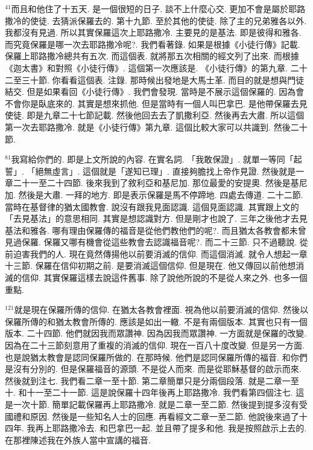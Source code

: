 \documentclass{book}
\begin{document}
$^{41}$而且和他住了十五天.
是一個很短的日子.
談不上什麼心交.
更加不會是屬於耶路撒冷的使徒.
去猜派保羅去的.
第十九節.
至於其他的使徒.
除了主的兄弟雅各以外.
我都沒有見過.
所以其實保羅這次上耶路撒冷.
主要見的是基法.
即是彼得和雅各.
而究竟保羅是哪一次去耶路撒冷呢?.
我們看著錄.
如果是根據《小徒行傳》記載.
保羅上耶路撒冷總共有五次.
而這個表.
就將那五次相關的經文列了出來.
而根據《迦太書》和對照《小徒行傳》.
這個第一次應該是.
《小徒行傳》的第九章.
二十二至三十節.
你看看這個表.
注錄.
那時候出發地是大馬士革.
而目的就是想與門徒結交.
但是如果看回《小徒行傳》.
我們會發現.
當時是不展示這個保羅的.
因為會不會你是臥底來的.
其實是想來抓他.
但是當時有一個人叫巴拿巴.
是他帶保羅去見使徒.
即是九章二十七節記載.
然後他回去去了凱撒利亞.
然後再去大肅.
所以這個第一次去耶路撒冷.
就是《小徒行傳》第九章.
這個比較大家可以共識到.
然後二十節.

$^{81}$我寫給你們的.
即是上文所說的內容.
在實名詞.
「我敢保證」.
就單一等同「起誓」.
「絕無虛言」.
這個就是「遂知已理」.
直接夠膽找上帝作見證.
然後就是一章二十一至二十四節.
後來我到了敘利亞和基尼加.
那位最愛的安提奧.
然後是基尼加.
然後是大肅.
一拜的地方.
即是表示保羅是馬不停蹄地.
四處去傳道.
二十二節.
當時在基督律的猶太國教會.
說沒有跟我見面認識.
這個見面認識.
其實跟上文的「去見基法」的意思相同.
其實是想認識對方.
但是剛才也說了.
三年之後他才去見基法和雅各.
哪有理由保羅傳的福音是從他們教他們的呢?.
而且猶太各教會都未曾見過保羅.
保羅又哪有機會從這些教會去認識福音呢?.
而二十三節.
只不過聽說.
從前迫害我們的人.
現在竟然傳揚他以前要消滅的信仰.
而這個消滅.
就令人想起一章十三節.
保羅在信仰初期之前.
是要消滅這個信仰.
但是現在.
他又傳回以前他想消滅的信仰.
其實保羅這樣去說這件舊事.
除了說他所說的不是從人來之外.
也多一個重點.

$^{121}$就是現在保羅所傳的信仰.
在猶太各教會裡面.
視為他以前要消滅的信仰.
然後以保羅所傳的和猶太教會所傳的.
應該是如出一轍.
不是有兩個版本.
其實也只有一個版本.
二十四節.
他們就因我而眾讚神.
因為因我而眾讚神.
一方面就是保羅的改變.
因為在二十三節刻意用了重複的消滅的信仰.
現在一百八十度改變.
但是另一方面.
也是說猶太教會是認同保羅所做的.
在那時候.
他們是認同保羅所傳的福音.
和你們是沒有分別的.
但是保羅福音的源頭.
不是從人而來.
而是從耶穌基督的啟示而來.
然後就到注七.
我們看二章一至十節.
第二章簡單只是分兩個段落.
就是二章一至十.
和十一至二十一節.
這是說保羅十四年後再上耶路撒冷.
我們看第四個注七.
這是一次十節.
簡單記載保羅再上耶路撒冷.
就是二章一至二節.
然後提到提多沒有受國禮和原因.
然後是一些知名人士的回應.
再看經文二章一至二節.
他說後來過了十四年.
我再上耶路撒冷去.
和巴拿巴一起.
並且帶了提多和他.
我是按照啟示上去的.
在那裡陳述我在外族人當中宣講的福音.
\end{document}
